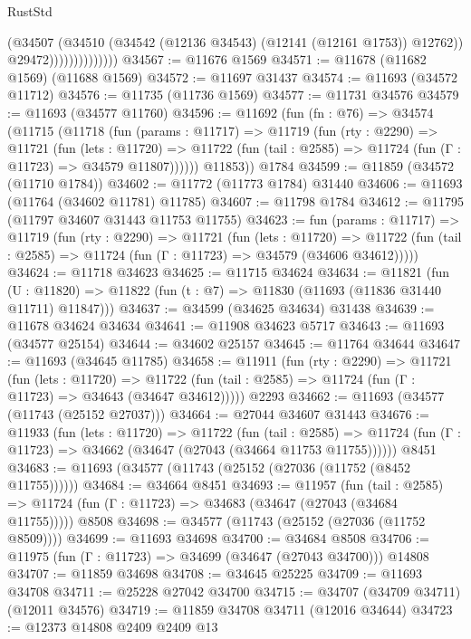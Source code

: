 \begin{lexlean}{RustStd}
\begin{coremodule}
                              (@34507
                                (@34510 (@34542 (@12136 @34543) (@12141 (@12161 @1753)) @12762))
                                @29472))))))))))))))
@34567 := @11676 @1569
@34571 := @11678 (@11682 @1569) (@11688 @1569)
@34572 := @11697 @31437
@34574 := @11693 (@34572 @11712)
@34576 := @11735 (@11736 @1569)
@34577 := @11731 @34576
@34579 := @11693 (@34577 @11760)
@34596 := @11692
    (fun (fn : @76) =>
    @34574
      (@11715
        (@11718
          (fun (params : @11717) =>
          @11719
            (fun (rty : @2290) =>
            @11721
              (fun (lets : @11720) =>
              @11722 (fun (tail : @2585) => @11724 (fun (Γ : @11723) => @34579 @11807))))))
        @11853))
    @1784
@34599 := @11859 (@34572 (@11710 @1784))
@34602 := @11772 (@11773 @1784) @31440
@34606 := @11693 (@11764 (@34602 @11781) @11785)
@34607 := @11798 @1784
@34612 := @11795 (@11797 @34607 @31443 @11753 @11755)
@34623 := fun (params : @11717) =>
  @11719
    (fun (rty : @2290) =>
    @11721
      (fun (lets : @11720) =>
      @11722 (fun (tail : @2585) => @11724 (fun (Γ : @11723) => @34579 (@34606 @34612)))))
@34624 := @11718 @34623
@34625 := @11715 @34624
@34634 := @11821
    (fun (U : @11820) => @11822 (fun (t : @7) => @11830 (@11693 (@11836 @31440 @11711) @11847)))
@34637 := @34599 (@34625 @34634) @31438
@34639 := @11678 @34624 @34634
@34641 := @11908 @34623 @5717
@34643 := @11693 (@34577 @25154)
@34644 := @34602 @25157
@34645 := @11764 @34644
@34647 := @11693 (@34645 @11785)
@34658 := @11911
    (fun (rty : @2290) =>
    @11721
      (fun (lets : @11720) =>
      @11722 (fun (tail : @2585) => @11724 (fun (Γ : @11723) => @34643 (@34647 @34612)))))
    @2293
@34662 := @11693 (@34577 (@11743 (@25152 @27037)))
@34664 := @27044 @34607 @31443
@34676 := @11933
    (fun (lets : @11720) =>
    @11722
      (fun (tail : @2585) =>
      @11724 (fun (Γ : @11723) => @34662 (@34647 (@27043 (@34664 @11753 @11755))))))
    @8451
@34683 := @11693 (@34577 (@11743 (@25152 (@27036 (@11752 (@8452 @11755))))))
@34684 := @34664 @8451
@34693 := @11957
    (fun (tail : @2585) => @11724 (fun (Γ : @11723) => @34683 (@34647 (@27043 (@34684 @11755)))))
    @8508
@34698 := @34577 (@11743 (@25152 (@27036 (@11752 @8509))))
@34699 := @11693 @34698
@34700 := @34684 @8508
@34706 := @11975 (fun (Γ : @11723) => @34699 (@34647 (@27043 @34700))) @14808
@34707 := @11859 @34698
@34708 := @34645 @25225
@34709 := @11693 @34708
@34711 := @25228 @27042 @34700
@34715 := @34707 (@34709 @34711) (@12011 @34576)
@34719 := @11859 @34708 @34711 (@12016 @34644)
@34723 := @12373 @14808 @2409 @2409 @13

\end{coremodule}
\end{lexlean}
